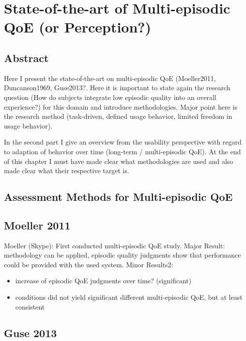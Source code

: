 \chapter{State-of-the-art of Multi-episodic QoE (or Perception?)}\label{chap:05} %
\section*{Abstract}

Here I present the state-of-the-art on multi-episodic QoE (Moeller2011, Duncanson1969, Guse2013?.
Here it is important to state again the research question (How do subjects integrate low episodic quality into an overall experience?) for this domain and introduce methodologies.
Major point here is the research method (task-driven, defined usage behavior, limited freedom in usage behavior).

In the second part I give an overview from the usability perspective with regard to adaption of behavior over time (long-term / multi-episodic QoE).
At the end of this chapter I must have made clear what methodologies are used and also made clear what their respective target is.


\section{Assessment Methods for Multi-episodic QoE}

\section{Moeller 2011}
Moeller (Skype): First conducted multi-episodic QoE study.
Major Result: methodology can be applied, episodic quality judgments show that performance could be provided with the used system.
Minor Results2: 
\begin{itemize}
\item increase of episodic QoE judgments over time? (significant)
\item conditions did not yield significant different multi-episodic QoE, but at least consistent
\end{itemize}
\section{Guse 2013}
